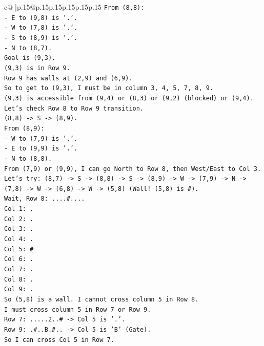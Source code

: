 \documentclass{article}
\begin{document}
{\begin{supertabular}{c@{$\;$}|p{.15\linewidth}@{}p{.15\linewidth}p{.15\linewidth}p{.15\linewidth}p{.15\linewidth}p{.15\linewidth}}
{{{\texttt{From (8,8):} \\
\texttt{{-} E to (9,8) is '.'.} \\
\texttt{{-} W to (7,8) is '.'.} \\
\texttt{{-} S to (8,9) is '.'.} \\
\texttt{{-} N to (8,7).} \\
\texttt{Goal is (9,3).} \\
\texttt{(9,3) is in Row 9.} \\
\texttt{Row 9 has walls at (2,9) and (6,9).} \\
\texttt{So to get to (9,3), I must be in column 3, 4, 5, 7, 8, 9.} \\
\texttt{(9,3) is accessible from (9,4) or (8,3) or (9,2) (blocked) or (9,4).} \\
\texttt{Let's check Row 8 to Row 9 transition.} \\
\texttt{(8,8) {-}> S {-}> (8,9).} \\
\texttt{From (8,9):} \\
\texttt{{-} W to (7,9) is '.'.} \\
\texttt{{-} E to (9,9) is '.'.} \\
\texttt{{-} N to (8,8).} \\
\texttt{From (7,9) or (9,9), I can go North to Row 8, then West/East to Col 3.} \\
\texttt{Let's try: (8,7) {-}> S {-}> (8,8) {-}> S {-}> (8,9) {-}> W {-}> (7,9) {-}> N {-}> (7,8) {-}> W {-}> (6,8) {-}> W {-}> (5,8) (Wall! (5,8) is \#).} \\
\texttt{Wait, Row 8: ....\#....} \\
\texttt{Col 1: .} \\
\texttt{Col 2: .} \\
\texttt{Col 3: .} \\
\texttt{Col 4: .} \\
\texttt{Col 5: \#} \\
\texttt{Col 6: .} \\
\texttt{Col 7: .} \\
\texttt{Col 8: .} \\
\texttt{Col 9: .} \\
\texttt{So (5,8) is a wall. I cannot cross column 5 in Row 8.} \\
\texttt{I must cross column 5 in Row 7 or Row 9.} \\
\texttt{Row 7: .....2..\# {-}> Col 5 is '.'.} \\
\texttt{Row 9: .\#..B.\#.. {-}> Col 5 is 'B' (Gate).} \\
\texttt{So I can cross Col 5 in Row 7.} \\
}}}
\end{supertabular}}
\end{document}
